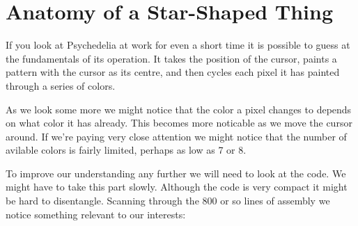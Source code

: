 \chapter{Anatomy of a Star-Shaped Thing} 
\lstset{style=6502Style}

If you look at Psychedelia at work for even a short time it is possible to guess at the fundamentals
of its operation. It takes the position of the cursor, paints a pattern with the cursor as its centre,
and then cycles each pixel it has painted through a series of colors.

As we look some more we might notice that the color a pixel changes to depends on what color it has already.
This becomes more noticable as we move the cursor around. If we're paying very close attention we might notice
that the number of avilable colors is fairly limited, perhaps as low as 7 or 8.

To improve our understanding any further we will need to look at the code. We might have to take this part slowly.
Although the code is very compact it might be hard to disentangle. Scanning through the 800 or so lines of assembly
we notice something relevant to our interests:

